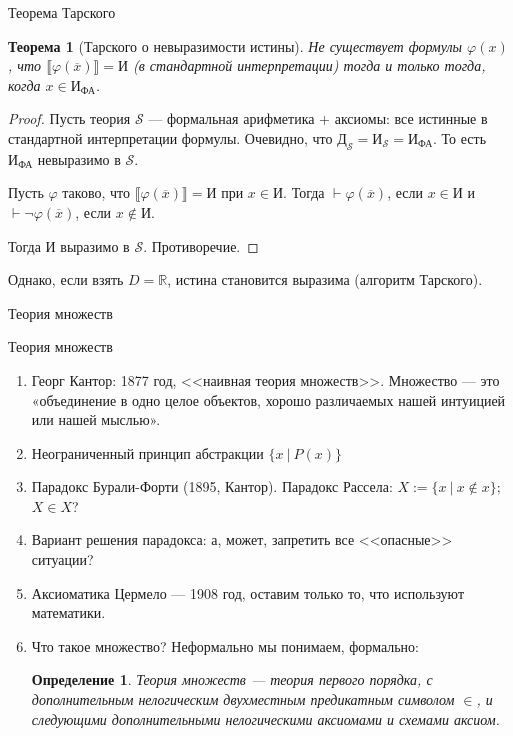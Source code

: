 \documentclass[aspectratio=169]{beamer}
\newtheorem{thm}{Теорема}[section]
\newtheorem{dfn}{Определение}[section]
\begin{document}
\begin{frame}{Теорема Тарского}
\begin{thm}[Тарского о невыразимости истины]
Не существует формулы $\varphi(x)$, что $\llbracket \varphi(\overline{x}) \rrbracket = \text{И}$ (в стандартной интерпретации) тогда и только
тогда, когда $x \in \text{И}_\text{ФА}$. \end{thm}
\begin{proof}
Пусть теория $\mathcal{S}$ --- формальная арифметика + аксиомы: все истинные в стандартной интерпретации формулы.
Очевидно, что $\text{Д}_\mathcal{S} = \text{И}_\mathcal{S} = \text{И}_\text{ФА}$. 
То есть $\text{И}_\text{ФА}$ невыразимо в $\mathcal{S}$.

Пусть $\varphi$ таково, что $\llbracket\varphi(\overline{x})\rrbracket = \text{И}$ при $x \in \text{И}$.
Тогда $\vdash\varphi(\overline{x})$, если $x \in \text{И}$ и $\vdash\neg\varphi(\overline{x})$, если $x \notin\text{И}$.

Тогда $\text{И}$ выразимо в $\mathcal{S}$. Противоречие.
\end{proof}

\pause
Однако, если взять $D = \mathbb{R}$, истина становится выразима (алгоритм Тарского).
\end{frame}

\begin{frame}{}
\LARGE\begin{center}Теория множеств\end{center}
\end{frame}

\begin{frame}{Теория множеств}
\begin{enumerate}
\item Георг Кантор: 1877 год, <<наивная теория множеств>>. Множество --- это «объединение в одно
целое объектов, хорошо различаемых нашей интуицией или нашей мыслью».\pause
\item Неограниченный принцип абстракции $\{ x\ |\ P(x)\}$ \pause
\item Парадокс Бурали-Форти (1895, Кантор). Парадокс Рассела: $X := \{ x\ |\ x \notin x\}$; $X\in X$?\pause
\item Вариант решения парадокса: а, может, запретить все <<опасные>> ситуации? \pause
\item Аксиоматика Цермело --- 1908 год, оставим только то, что используют математики. \pause
\item Что такое множество? Неформально мы понимаем, формально:\pause

\begin{dfn} Теория множеств --- теория первого порядка,
с дополнительным нелогическим двухместным предикатным символом $\in$, и следующими 
дополнительными нелогическими аксиомами и схемами аксиом.
\end{dfn}
\end{enumerate}
\end{frame}
\end{document}
